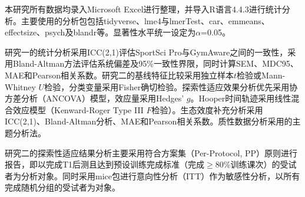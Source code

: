 本研究所有数据均录入Microsoft Excel进行整理，并导入R语言4.4.3进行统计分析。主要使用的分析包包括tidyverse、lme4与lmerTest、car、emmeans、effectsize、psych及blandr等。显著性水平统一设定为$\alpha$=0.05。

研究一的统计分析采用ICC(2,1)评估SportSci Pro与GymAware之间的一致性，采用Bland-Altman方法评估系统偏差及95\%一致性界限，同时计算SEM、MDC95、MAE和Pearson相关系数。研究二的基线特征比较采用独立样本$t$检验或Mann-Whitney $U$检验，分类变量采用Fisher确切检验。探索性适应效果分析优先采用协方差分析（ANCOVA）模型，效应量采用Hedges' $g$。Hooper时间轨迹采用线性混合效应模型（Kenward-Roger Type III $F$检验）。生态效度补充分析采用ICC(2,1)、Bland-Altman分析、MAE和Pearson相关系数。质性数据分析采用\citep{BraunClarke2006}的主题分析法。

研究二的探索性适应结果分析主要采用符合方案集（Per-Protocol, PP）原则进行报告，即以完成T1后测且达到预设训练完成标准（完成$\geq$80\%训练课次）的受试者为分析对象。同时采用mice包进行意向性分析（ITT）作为敏感性分析，以所有完成随机分组的受试者为对象。

